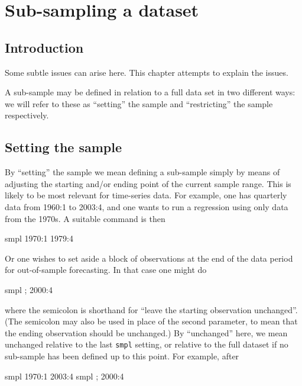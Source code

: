 \chapter{Sub-sampling a dataset}
\label{sampling}

\section{Introduction}
\label{sample-intro}

Some subtle issues can arise here.  This chapter attempts to explain
the issues.

A sub-sample may be defined in relation to a full data set in two
different ways: we will refer to these as ``setting'' the sample and
``restricting'' the sample respectively.

\section{Setting the sample}
\label{sample-set}

By ``setting'' the sample we mean defining a sub-sample simply by
means of adjusting the starting and/or ending point of the current
sample range.  This is likely to be most relevant for time-series
data.  For example, one has quarterly data from 1960:1 to 2003:4, and
one wants to run a regression using only data from the 1970s.  A
suitable command is then

\begin{code}
    smpl 1970:1 1979:4
\end{code}

Or one wishes to set aside a block of observations at the end of the
data period for out-of-sample forecasting.  In that case one might do

\begin{code}
    smpl ; 2000:4
\end{code}

where the semicolon is shorthand for ``leave the starting observation
unchanged''.  (The semicolon may also be used in place of the second
parameter, to mean that the ending observation should be unchanged.)
By ``unchanged'' here, we mean unchanged relative to the last
\verb+smpl+ setting, or relative to the full dataset if no sub-sample
has been defined up to this point. For example, after

\begin{code}
    smpl 1970:1 2003:4
    smpl ; 2000:4
\end{code}

